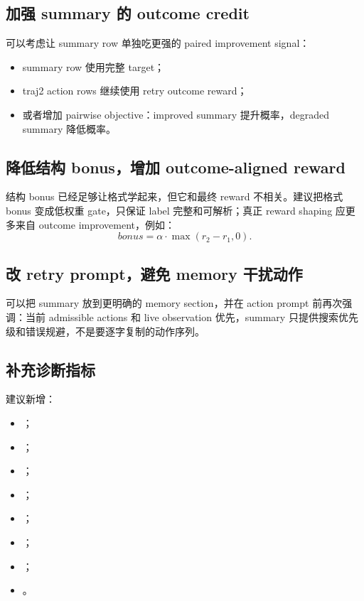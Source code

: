 \documentclass[10pt]{ctexart}
\begin{document}
\subsection{加强 summary 的 outcome credit}
可以考虑让 summary row 单独吃更强的 paired improvement signal：
\begin{itemize}
  \item summary row 使用完整  target；
  \item traj2 action rows 继续使用 retry outcome reward；
  \item 或者增加 pairwise objective：improved summary 提升概率，degraded summary 降低概率。
\end{itemize}

\subsection{降低结构 bonus，增加 outcome-aligned reward}
结构 bonus 已经足够让格式学起来，但它和最终 reward 不相关。建议把格式 bonus 变成低权重 gate，只保证 label 完整和可解析；真正 reward shaping 应更多来自 outcome improvement，例如：
\begin{equation}
  bonus = \alpha \cdot \max(r_2-r_1, 0).
\end{equation}

\subsection{改 retry prompt，避免 memory 干扰动作}
可以把 summary 放到更明确的 memory section，并在 action prompt 前再次强调：当前 admissible actions 和 live observation 优先，summary 只提供搜索优先级和错误规避，不是要逐字复制的动作序列。

\subsection{补充诊断指标}
建议新增：
\begin{itemize}
  \item {}；
  \item {}；
  \item {}；
  \item {}；
  \item {}；
  \item {}；
  \item {}；
  \item {}。
\end{itemize}
\end{document}
